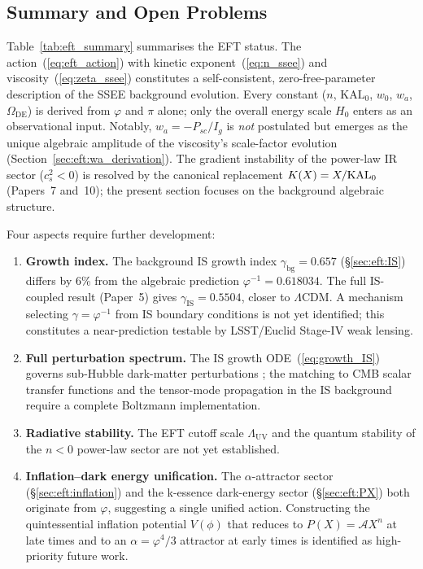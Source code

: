 \subsection{Summary and Open Problems}
\label{sec:eft:status}

Table~\ref{tab:eft_summary} summarises the EFT status.
The action~(\ref{eq:eft_action}) with kinetic exponent~(\ref{eq:n_ssee})
and viscosity~(\ref{eq:zeta_ssee}) constitutes a self-consistent,
zero-free-parameter description of the SSEE background evolution.
Every constant ($n$, $\mathrm{KAL}_{0}$, $w_0$, $w_a$, $\Omega_{\mathrm{DE}}$) is
derived from $\varphi$ and $\pi$ alone; only the overall energy scale $H_{0}$
enters as an observational input.  Notably, $w_a = -P_{sc}/I_g$ is
\emph{not} postulated but emerges as the unique algebraic amplitude
of the viscosity's scale-factor evolution
(Section~\ref{sec:eft:wa_derivation}).
The gradient instability of the power-law IR sector ($c_s^2<0$) is
resolved by the canonical replacement $K(X)=X/\mathrm{KAL}_0$ (Papers~7 and~10);
the present section focuses on the background algebraic structure.

Four aspects require further development:
%
\begin{enumerate}
  \item \textbf{Growth index.}
        The background IS growth index $\gamma_{\mathrm{bg}} = 0.657$
        (\S\ref{sec:eft:IS}) differs by 6\% from the algebraic prediction
        $\varphi^{-1} = 0.618034$.  The full IS-coupled result (Paper~5)
        gives $\gamma_{\mathrm{IS}} = 0.5504$, closer to $\Lambda$CDM.
        A mechanism selecting $\gamma = \varphi^{-1}$ from IS boundary
        conditions is not yet identified; this constitutes a near-prediction
        testable by LSST/Euclid Stage-IV weak lensing.

  \item \textbf{Full perturbation spectrum.}
        The IS growth ODE~(\ref{eq:growth_IS}) governs sub-Hubble dark-matter
        perturbations \citep{Mukhanov1992}; the matching to CMB scalar transfer functions and
        the tensor-mode propagation in the IS background require a complete
        Boltzmann implementation.

  \item \textbf{Radiative stability.}
        The EFT cutoff scale $\Lambda_{\mathrm{UV}}$ and the quantum stability
        of the $n < 0$ power-law sector are not yet established.

  \item \textbf{Inflation--dark energy unification.}
        The $\alpha$-attractor sector (\S\ref{sec:eft:inflation}) and the
        k-essence dark-energy sector (\S\ref{sec:eft:PX}) both originate
        from $\varphi$, suggesting a single unified action.
        Constructing the quintessential inflation potential $V(\phi)$
        that reduces to $P(X) = \mathcal{A}X^n$ at late times
        and to an $\alpha=\varphi^4/3$ attractor at early times
        is identified as high-priority future work.
\end{enumerate}

